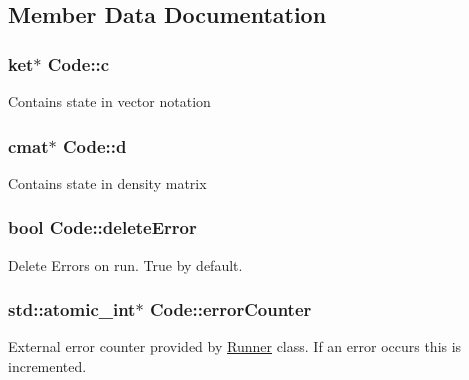 \subsection{Member Data Documentation}
\subsubsection[{\texorpdfstring{c}{c}}]{\setlength{\rightskip}{0pt plus 5cm}ket$\ast$ Code\+::c\hspace{0.3cm}{\ttfamily [protected]}}\hypertarget{class_code_a01a6ba9da79914bc6980ffddf53ecb24}{}\label{class_code_a01a6ba9da79914bc6980ffddf53ecb24}
Contains state in vector notation 
\subsubsection[{\texorpdfstring{d}{d}}]{\setlength{\rightskip}{0pt plus 5cm}cmat$\ast$ Code\+::d\hspace{0.3cm}{\ttfamily [protected]}}\hypertarget{class_code_a92025265fbd17156f2a3dc7a6e5364f6}{}\label{class_code_a92025265fbd17156f2a3dc7a6e5364f6}
Contains state in density matrix 
\subsubsection[{\texorpdfstring{delete\+Error}{deleteError}}]{\setlength{\rightskip}{0pt plus 5cm}bool Code\+::delete\+Error\hspace{0.3cm}{\ttfamily [protected]}}\hypertarget{class_code_ae448fe74faf959e28ae7a17d13dd4790}{}\label{class_code_ae448fe74faf959e28ae7a17d13dd4790}
Delete Errors on run. True by default. 
\subsubsection[{\texorpdfstring{error\+Counter}{errorCounter}}]{\setlength{\rightskip}{0pt plus 5cm}std\+::atomic\+\_\+int$\ast$ Code\+::error\+Counter}\hypertarget{class_code_ab4f00a8ff5a23276a54c7b163b34219a}{}\label{class_code_ab4f00a8ff5a23276a54c7b163b34219a}
External error counter provided by \hyperlink{class_runner}{Runner} class. If an error occurs this is incremented. 
